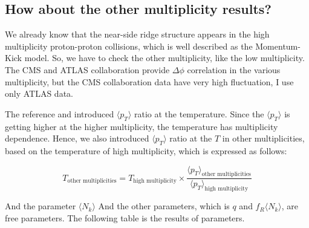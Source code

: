 \documentclass[jkps,fleqn,showpacs,showkeys]{revtex4}
\begin{document}
\subsection*{How about the other multiplicity results?}
\label{subsec:How about the other multiplicity results?}

We already know that the near-side ridge structure appears in the high multiplicity proton-proton collisions, which is well described as the Momentum-Kick model.
So, we have to check the other multiplicity, like the low multiplicity.
The CMS and ATLAS collaboration provide $\Delta \phi$ correlation in the various multiplicity, but the CMS collaboration data have very high fluctuation, I use only ATLAS data.

The reference \cite{Wong_5} and \cite{PbPb} introduced $\langle p_T \rangle$ ratio at the temperature.
Since the $\langle p_T \rangle$ is getting higher at the higher multiplicity, the temperature has multiplicity dependence.
Hence, we also introduced $\langle p_T \rangle$ ratio at the $T$ in other multiplicities, based on the temperature of high multiplicity, which is expressed as follows:

\begin{equation} \label{equation:variousmulti}
  T_{\text{other multiplicities}} = T_{\text{high multiplicity}} \times \frac{\langle p_T \rangle_{\text{other multiplicities}}}{\langle p_T \rangle_{\text{high multiplicity}}}
\end{equation}

And the parameter $\langle N_k \rangle$ 
And the other parameters, which is $q$ and $f_R \langle N_k \rangle$, are free parameters.
The following table is the results of parameters.
\end{document}
